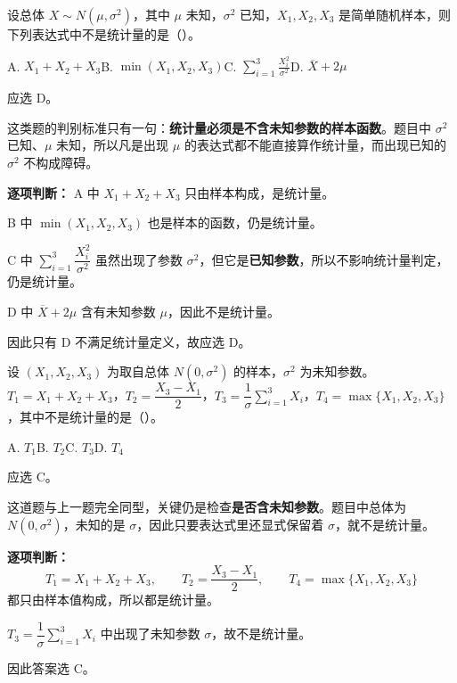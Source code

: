 ﻿\documentclass[lang=cn,11pt]{elegantbook}
\begin{document}
\begin{exercise}\label{exer:6-statistic-judge}
设总体 \(X \sim N(\mu, \sigma^2)\)，其中 \(\mu\) 未知，\(\sigma^2\) 已知，\(X_1, X_2, X_3\) 是简单随机样本，则下列表达式中不是统计量的是（\quad）。\par
A. \(X_1 + X_2 + X_3\)\qquad B. \(\min(X_1, X_2, X_3)\)\qquad C. \(\displaystyle\sum_{i=1}^{3}\frac{X_i^2}{\sigma^2}\)\qquad D. \(\overline{X} + 2\mu\)
\end{exercise}

\begin{solution}
应选 D。

这类题的判别标准只有一句：\textbf{统计量必须是不含未知参数的样本函数}。题目中 \(\sigma^2\) 已知、\(\mu\) 未知，所以凡是出现 \(\mu\) 的表达式都不能直接算作统计量，而出现已知的 \(\sigma^2\) 不构成障碍。

\textbf{逐项判断：}
A 中 \(X_1+X_2+X_3\) 只由样本构成，是统计量。

B 中 \(\min(X_1,X_2,X_3)\) 也是样本的函数，仍是统计量。

C 中 \(\sum\limits_{i=1}^{3}\dfrac{X_i^2}{\sigma^2}\) 虽然出现了参数 \(\sigma^2\)，但它是\textbf{已知参数}，所以不影响统计量判定，仍是统计量。

D 中 \(\overline{X}+2\mu\) 含有未知参数 \(\mu\)，因此不是统计量。

因此只有 D 不满足统计量定义，故应选 D。
\end{solution}

\begin{exercise}\label{exer:6-statistic-sigma}
设 \((X_1, X_2, X_3)\) 为取自总体 \(N(0, \sigma^2)\) 的样本，\(\sigma^2\) 为未知参数。\(T_1 = X_1+X_2+X_3\)，\(T_2 = \dfrac{X_3 - X_1}{2}\)，\(T_3 = \dfrac{1}{\sigma}\sum_{i=1}^{3}X_i\)，\(T_4 = \max\{X_1, X_2, X_3\}\)，其中不是统计量的是（\quad）。\par
A. \(T_1\)\qquad B. \(T_2\)\qquad C. \(T_3\)\qquad D. \(T_4\)
\end{exercise}
\begin{solution}
应选 C。

这道题与上一题完全同型，关键仍是检查\textbf{是否含未知参数}。题目中总体为 \(N(0,\sigma^2)\)，未知的是 \(\sigma\)，因此只要表达式里还显式保留着 \(\sigma\)，就不是统计量。

\textbf{逐项判断：}
\[
T_1=X_1+X_2+X_3,\qquad T_2=\frac{X_3-X_1}{2},\qquad T_4=\max\{X_1,X_2,X_3\}
\]
都只由样本值构成，所以都是统计量。

\(T_3=\dfrac{1}{\sigma}\sum_{i=1}^{3}X_i\) 中出现了未知参数 \(\sigma\)，故不是统计量。

因此答案选 C。
\end{solution}
\end{document}
